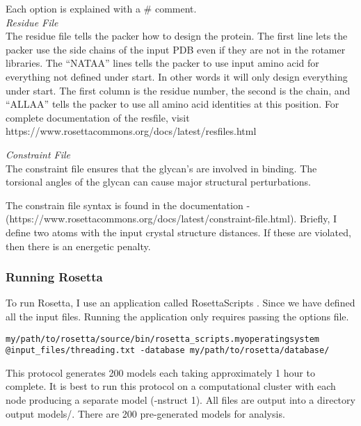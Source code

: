 
Each option is explained with a \# comment.\\

\textit{Residue File}\\
The residue file tells the packer how to design the protein. The first line lets the packer use the side chains of the input PDB even if they are not in the rotamer libraries. The ``NATAA'' lines tells the packer to use input amino acid for everything not defined under start. In other words it will only design everything under start. The first column is the residue number, the second is the chain, and ``ALLAA'' tells the packer to use all amino acid identities at this position. For complete documentation of the resfile, visit https://www.rosettacommons.org/docs/latest/resfiles.html



\textit{Constraint File} \\
The constraint file ensures that the glycan's are involved in binding. The torsional angles of the glycan can cause major structural perturbations.


The constrain file syntax is found in the documentation - (https://www.rosettacommons.org/docs/latest/constraint-file.html). Briefly, I define two atoms with the input crystal structure distances. If these are violated, then there is an energetic penalty. \\

\subsubsection{Running Rosetta}
To run Rosetta, I use an application called RosettaScripts \citep{Fleishman:2011ji}. Since we have defined all the input files. Running the application only requires passing the options file.

\begin{lstlisting}[breaklines=true]
my/path/to/rosetta/source/bin/rosetta_scripts.myoperatingsystem @input_files/threading.txt -database my/path/to/rosetta/database/
\end{lstlisting}

This protocol generates 200 models each taking approximately 1 hour to complete. It is best to run this protocol on a computational cluster with each node producing a separate model (-nstruct 1). All files are output into a directory output models/. There are 200 pre-generated models for analysis. \\

